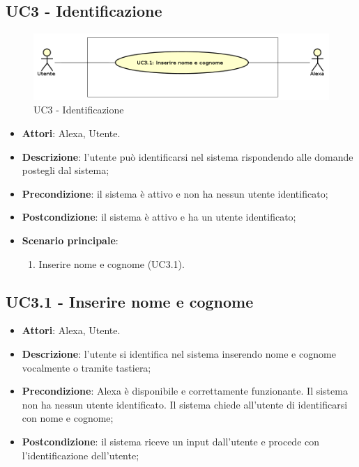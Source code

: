 \documentclass[../AnalisiDeiRequisiti.tex]{subfiles}
\begin{document}
\subsection{UC3 - Identificazione} 
\label{sssec:UC3} 
\begin{figure}[!h]
	\centering
	\includegraphics[width=\textwidth]{UseCases/UC3_Identificazione/UC3_Identificazione.png}
	\caption{UC3 - Identificazione}
\end{figure}
\begin{itemize} 
\item \textbf{Attori}: Alexa, Utente.
\item \textbf{Descrizione}: l'utente può identificarsi nel sistema rispondendo alle domande postegli dal sistema;
\item \textbf{Precondizione}: il sistema è attivo e non ha nessun utente identificato;
\item \textbf{Postcondizione}: il sistema è attivo e ha un utente identificato;
\item \textbf{Scenario principale}: \begin{enumerate}\item Inserire nome e cognome (UC3.1). 
 \end{enumerate}
\end{itemize} 
\subsection{UC3.1 - Inserire nome e cognome} 
\label{sssec:UC3.1} 
\begin{itemize} 
\item \textbf{Attori}: Alexa, Utente.
\item \textbf{Descrizione}: l'utente si identifica nel sistema inserendo nome e cognome vocalmente o tramite tastiera;
\item \textbf{Precondizione}: Alexa è disponibile e correttamente funzionante. Il sistema non ha nessun utente identificato. Il sistema chiede all'utente di identificarsi con nome e cognome;
\item \textbf{Postcondizione}: il sistema riceve un input dall'utente e procede con l'identificazione dell'utente;
\end{itemize} 
\end{document}
